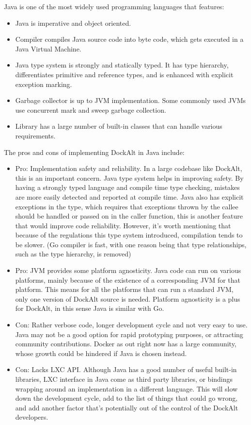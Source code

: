 \documentclass[letterpaper,twocolumn,10pt]{article}
\begin{document}

Java is one of the most widely used programming languages that features:
\begin{itemize}
\item Java is imperative and object oriented. \cite{JavaWikipedia}
\item Compiler compiles Java source code into byte code, which gets executed in a Java Virtual Machine.
\item Java type system is strongly and statically typed. It has type hierarchy, differentiates primitive and reference types, and is enhanced with explicit exception marking. \cite{JavaType}
\item Garbage collector is up to JVM implementation. Some commonly used JVMs use concurrent mark and sweep garbage collection.
\item Library has a large number of built-in classes that can handle various requirements.
\end{itemize}
The pros and cons of implementing DockAlt in Java include: 
\begin{itemize}
\item Pro: Implementation safety and reliability. In a large codebase like DockAlt, this is an important concern. Java type system helps in improving safety. By having a strongly typed language and compile time type checking, mistakes are more easily detected and reported at compile time. Java also has explicit exceptions in the type, which requires that exceptions thrown by the callee should be handled or passed on in the caller function, this is another feature that would improve code reliability. However, it's worth mentioning that because of the regulations this type system introduced, compilation tends to be slower. (Go compiler is fast, with one reason being that type relationships, such as the type hierarchy, is removed)
\item Pro: JVM provides some platform agnosticity. Java code can run on various platforms, mainly because of the existence of a corresponding JVM for that platform. This means for all the platforms that can run a standard JVM, only one version of DockAlt source is needed. Platform agnosticity is a plus for DockAlt, in this sense Java is similar with Go.
\item Con: Rather verbose code, longer development cycle and not very easy to use. Java may not be a good option for rapid prototyping purposes, or attracting community contributions. Docker as out right now has a large community, whose growth could be hindered if Java is chosen instead.
\item Con: Lacks LXC API. Although Java has a good number of useful built-in libraries, LXC interface in Java come as third party libraries, or bindings wrapping around an implementation in a different language. This will slow down the development cycle, add to the list of things that could go wrong, and add another factor that's potentially out of the control of the DockAlt developers.
\end{itemize}
\end{document}
